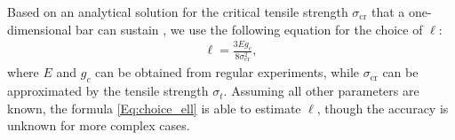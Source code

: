 \begin{remark}\label{Rem:choice_ell}
{Based on an analytical solution for the critical tensile strength $\sigma_\text{cr}$ that a one-dimensional bar can sustain \cite{Bourdin2014014301}, we use the following equation for the choice of $\ell$:}
\begin{equation}\label{Eq:choice_ell}
    \begin{aligned}
        \ell=\frac{3Eg_c}{8\sigma_\text{cr}^2},
    \end{aligned}
\end{equation}
where $E$ and $g_c$ can be obtained from regular experiments, while $\sigma_\text{cr}$ can be approximated by the tensile strength $\sigma_t$. Assuming all {other} parameters are known, the formula \eqref{Eq:choice_ell} is able to estimate $\ell$, though the accuracy is unknown for more complex cases.
\end{remark}
